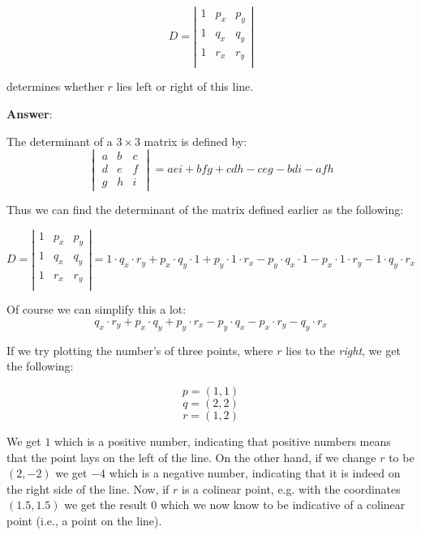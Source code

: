\begin{equation}
	D = \left| \begin{array}{ccc}
		1 & p_x & p_y \\
		1 & q_x & q_y \\
		1 & r_x & r_y \\
	\end{array} \right|
\end{equation}

determines whether $r$ lies left or right of this line.

\noindent
\textbf{Answer}:
\noindent

The determinant of a $3 \times 3$ matrix is defined by:
\begin{equation}
\begin{vmatrix}
a & b & c \\
d & e & f \\
g & h & i
\end{vmatrix}
= aei + bfg + cdh - ceg - bdi - afh
\end{equation}


Thus we can find the determinant of the matrix defined earlier as the following:

\begin{equation}
	D = \left| \begin{array}{ccc}
		1 & p_x & p_y \\
		1 & q_x & q_y \\
		1 & r_x & r_y \\
	\end{array} \right| = 1 \cdot q_{x} \cdot r_{y} + p_{x} \cdot q_{y} \cdot 1 + p_{y} \cdot 1 \cdot r_{x} - p_{y} \cdot q_{x} \cdot 1 - p_{x} \cdot 1 \cdot r_{y} - 1 \cdot q_{y} \cdot r_{x}
\end{equation}

Of course we can simplify this a lot:
\begin{equation}
q_{x} \cdot r_{y} + p_{x} \cdot q_{y} + p_{y} \cdot r_{x} - p_{y} \cdot q_{x} - p_{x} \cdot r_{y} - q_{y} \cdot r_{x}
\end{equation}

If we try plotting the number's of three points, where $r$ lies to the \textit{right}, we get the following:

$$p = (1,1)$$
$$q = (2,2)$$
$$r = (1,2)$$

We get $1$ which is a positive number, indicating that positive numbers means that the point lays on the left of the line.
On the other hand, if we change $r$ to be $(2, -2)$ we get $-4$ which is a negative number, indicating that it is indeed on the right side of the line. Now, if $r$ is a colinear point, e.g. with the coordinates $(1.5, 1.5)$ we get the result $0$ which we now know to be indicative of a colinear point (i.e., a point on the line).

